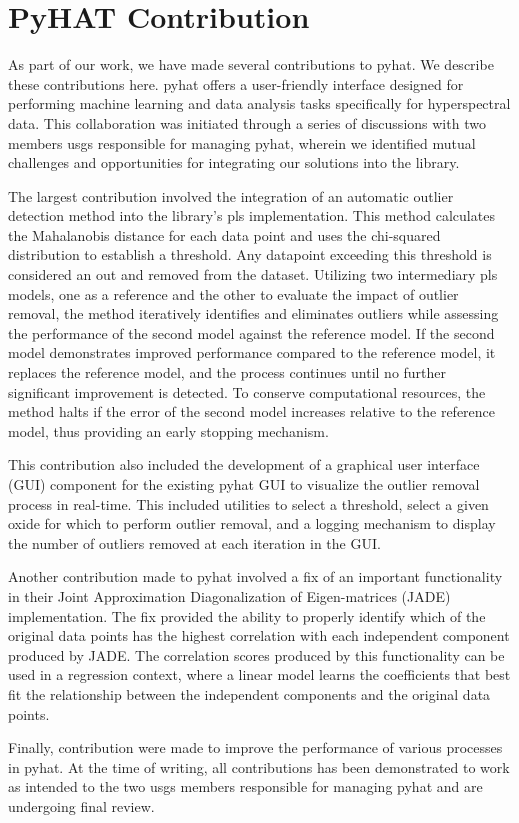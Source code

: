 \section{PyHAT Contribution}\label{sec:pyhat_contribution}
As part of our work, we have made several contributions to \gls{pyhat}. 
We describe these contributions here.
\gls{pyhat} offers a user-friendly interface designed for performing machine learning and data analysis tasks specifically for hyperspectral data.
This collaboration was initiated through a series of discussions with two members \gls{usgs} responsible for managing \gls{pyhat}, wherein we identified mutual challenges and opportunities for integrating our solutions into the library.

The largest contribution involved the integration of an automatic outlier detection method into the library's \gls{pls} implementation. 
This method calculates the Mahalanobis distance for each data point and uses the chi-squared distribution to establish a threshold.
Any datapoint exceeding this threshold is considered an out and removed from the dataset.
Utilizing two intermediary \gls{pls} models, one as a reference and the other to evaluate the impact of outlier removal, the method iteratively identifies and eliminates outliers while assessing the performance of the second model against the reference model. 
If the second model demonstrates improved performance compared to the reference model, it replaces the reference model, and the process continues until no further significant improvement is detected. 
To conserve computational resources, the method halts if the error of the second model increases relative to the reference model, thus providing an early stopping mechanism.

This contribution also included the development of a graphical user interface (GUI) component for the existing \gls{pyhat} GUI to visualize the outlier removal process in real-time.
This included utilities to select a threshold, select a given oxide for which to perform outlier removal, and a logging mechanism to display the number of outliers removed at each iteration in the GUI.

Another contribution made to \gls{pyhat} involved a fix of an important functionality in their Joint Approximation Diagonalization of Eigen-matrices (JADE) implementation.
The fix provided the ability to properly identify which of the original data points has the highest correlation with each independent component produced by JADE.
The correlation scores produced by this functionality can be used in a regression context, where a linear model learns the coefficients that best fit the relationship between the independent components and the original data points.

Finally, contribution were made to improve the performance of various processes in \gls{pyhat}.
At the time of writing, all contributions has been demonstrated to work as intended to the two \gls{usgs} members responsible for managing \gls{pyhat} and are undergoing final review.

 